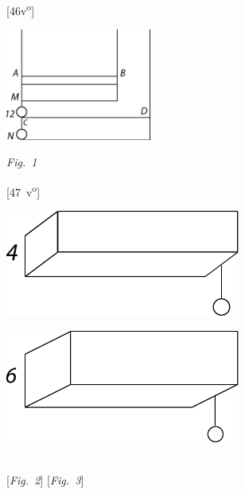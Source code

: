 %
%
\frenchspacing%
%
%
\vspace{8mm}
\pstart%
\noindent
\normalsize
[46v\textsuperscript{o}]
\pend
%
%
  \vspace*{0.0em}
  \centerline{\includegraphics[width=0.36\textwidth]{gesamttex/edit_VIII,3/images/LH_35_14_02_046v,047v_d1.pdf}}%
  \vspace*{0.5em}
  \centerline{\lbrack\textit{Fig.~1}\rbrack}%
  \label{LH_35_14_02_046v,047v_Fig.1}%
  \vspace{1.5em}%
%
%
\pstart%
\noindent
\normalsize
[47~v\textsuperscript{o}]
\pend
 \vspace{0.2em}
\pstart 
\begin{minipage}[t]{0.5\textwidth}
\includegraphics[width=0.58\textwidth]{gesamttex/edit_VIII,3/images/LH_35_14_02_046v,047v_d2.pdf}
\end{minipage}
\hspace{10mm}
\begin{minipage}[t]{0.5\textwidth}
\includegraphics[width=0.58\textwidth]{gesamttex/edit_VIII,3/images/LH_35_14_02_046v,047v_d3.pdf}
\end{minipage}\vspace{-0.5em}
\\
\hspace*{21mm} [\textit{Fig.~2}] \label{LH_35_14_02_046v,047v_Fig.2}\hspace*{67mm} [\textit{Fig.~3}] \label{LH_35_14_02_046v,047v_Fig.3}
